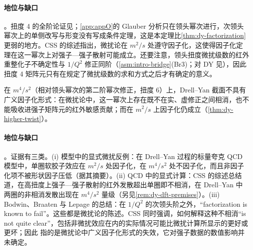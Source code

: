 \paragraph{地位与缺口}\tagA。扭度 4 的全阶论证见\cite{QiuSterman1991b}；\cref{app:appO}的 Glauber 分析只在领头幂次进行，次领头幂次上的单侧改写与形变没有写成条件定理，这是本定理比\cref{thm:dy-factorization}更弱的地方。CSS 的综述指出，微扰论在 $m^2/s$ 处遵守因子化，这使得因子化定理在这一幂次上对强子—强子散射可能成立\cite[第~10.2~节]{CollinsSoperSterman1989}。还要注意，领头扭度微扰级数的红外重整化子不确定性与 $1/Q^2$ 修正同阶（\cref{asm:intro-bridge}(Br3)；对 DY 见\cite{BenekeBraun1995b}），因此扭度 4 矩阵元只有在规定了微扰级数的求和方式之后才有确定的意义。

\begin{proposition}\label{prop:dy-twist6-failure}
在 $m^4/s^2$（相对领头幂次的第二阶幂次修正，扭度 6）上，Drell--Yan 截面不具有广义因子化形式：在微扰论中，这一幂次上存在既不在实、虚修正之间相消，也不能吸收进强子矩阵元的红外敏感贡献；而在 $m^2/s$ 上因子化仍成立（\cref{thm:dy-higher-twist}）。
\end{proposition}

\paragraph{地位与缺口}\tagV。证据有三类。(i) 模型中的显式微扰反例：在 Drell--Yan 过程的标量夸克 QCD 模型中，单圈软胶子效应在 $m^2/s$ 处因子化，在 $m^4/s^2$ 处不因子化，而且非因子化项不被形状因子压低\cite{Basu:1984ba}（据其摘要）。(ii) QCD 中的显式计算：CSS 的综述总结道，在高扭度上强子—强子散射的红外发散超出单圈即不相消，在 Drell--Yan 中两圈的非相消发散出现在 $m^4/s^2$ 量级\cite[第~10.2~节]{CollinsSoperSterman1989}（另见\cref{rem:dy-dft-premises}）。(iii) Bodwin、Braaten 与 Lepage 的总结：在 $1/Q^2$ 的次领头阶之外，“factorization is known to fail”\cite[第~VI~节]{BodwinBraatenLepage1995}。这些都是微扰论的陈述。CSS 同时强调，如何解释这种不相消“is not quite clear”，包括非微扰效应在内的实际情况可能比微扰计算所显示的更好或更坏\cite[第~10.2~节]{CollinsSoperSterman1989}；因此 \tagV 指的是微扰论中广义因子化形式的失效，它对强子数据的数值影响并未确定。
